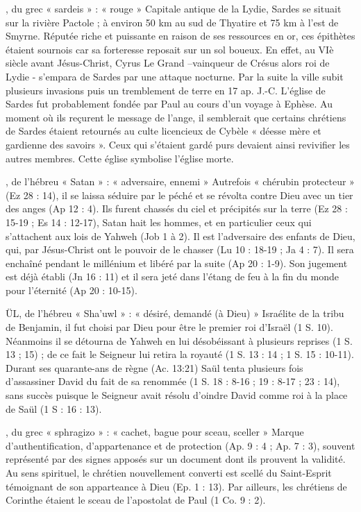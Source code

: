 \begin{multicols}{2}
, du grec « sardeis » : « rouge »
Capitale antique de la Lydie, Sardes se situait sur la rivière Pactole ; à environ 50 km au sud de Thyatire et 75 km à l’est de Smyrne. Réputée riche et puissante en raison de ses ressources en or, ces épithètes étaient sournois car sa forteresse reposait sur un sol boueux. En effet, au VIè siècle avant Jésus-Christ, Cyrus Le Grand –vainqueur de Crésus alors roi de Lydie - s’empara de Sardes par une attaque nocturne. Par la suite la ville subit plusieurs invasions puis un tremblement de terre en 17 ap. J.-C.
L’église de Sardes fut probablement fondée par Paul au cours d’un voyage à Ephèse. Au moment où ils reçurent le message de l’ange, il semblerait que certains chrétiens de Sardes étaient retournés au culte licencieux de Cybèle « déesse mère et gardienne des savoirs ». Ceux qui s’étaient gardé purs devaient ainsi revivifier les autres membres. Cette église symbolise l’église morte.


, de l'hébreu « Satan » : « adversaire, ennemi »
Autrefois « chérubin protecteur » (Ez 28 : 14), il se laissa séduire par le péché et se révolta contre Dieu avec un tier des anges (Ap 12 : 4). Ils furent chassés du ciel et précipités sur la terre (Ez 28 : 15-19 ; Es 14 : 12-17), Satan hait les hommes, et en particulier ceux qui s'attachent aux lois de Yahweh (Job 1 à 2). Il est l'adversaire des enfants de Dieu, qui, par Jésus-Christ ont le pouvoir de le chasser (Lu 10 : 18-19 ; Ja 4 : 7). Il sera enchaîné pendant le millénium et libéré par la suite (Ap 20 : 1-9). Son jugement est déjà établi (Jn 16 : 11) et il sera jeté dans l'étang de feu à la fin du monde pour l'éternité (Ap 20 : 10-15).


ÜL, de l'hébreu « Sha'uwl » : « désiré, demandé (à Dieu) »
Israélite de la tribu de Benjamin, il fut choisi par Dieu pour être le premier roi d'Israël (1 S. 10). Néanmoins il se détourna de Yahweh en lui désobéissant à plusieurs reprises (1 S. 13 ; 15) ; de ce fait le Seigneur lui retira la royauté (1 S. 13 : 14 ; 1 S. 15 : 10-11). Durant ses quarante-ans de règne (Ac. 13:21) Saül tenta plusieurs fois d'assassiner David du fait de sa renommée (1 S. 18 : 8-16 ; 19 : 8-17 ; 23 : 14), sans succès puisque le Seigneur avait résolu d'oindre David comme roi à la place de Saül (1 S : 16 : 13).


, du grec « sphragizo » : « cachet, bague pour sceau, sceller »
Marque d'authentification, d'appartenance et de protection (Ap. 9 : 4 ; Ap. 7 : 3), souvent représenté par des signes apposés sur un document dont ils prouvent la validité. Au sens spirituel, le chrétien nouvellement converti est scellé du Saint-Esprit témoignant de son apparteance à Dieu (Ep. 1 : 13). Par ailleurs, les chrétiens de Corinthe étaient le sceau de l'apostolat de Paul (1 Co. 9 : 2).



\end{multicols}
